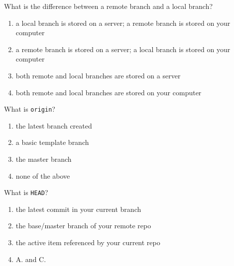 \documentclass[12pt,fleqn]{examtst}
\begin{document}
\newpage
\noindent
\begin{minipage}{\textwidth}

What is the difference between a remote branch and a local branch?

\begin{enumerate}
    \item a local branch is stored on a server; a remote branch is stored on your computer
    \item a remote branch is stored on a server; a local branch is stored on your computer
    \item both remote and local branches are stored on a server
    \item both remote and local branches are stored on your computer
\end{enumerate}
\rule{0cm}{1cm}

What is \lstinline{origin}?

\begin{enumerate}
    \item the latest branch created
    \item a basic template branch
    \item the master branch
    \item none of the above
\end{enumerate}
\rule{0cm}{1cm}

What is \lstinline{HEAD}?

\begin{enumerate}
    \item the latest commit in your current branch
    \item the base/master branch of your remote repo
    \item the active item referenced by your current repo
    \item A. and C.
\end{enumerate}
\rule{0cm}{1cm}

\end{minipage}

\end{document}
